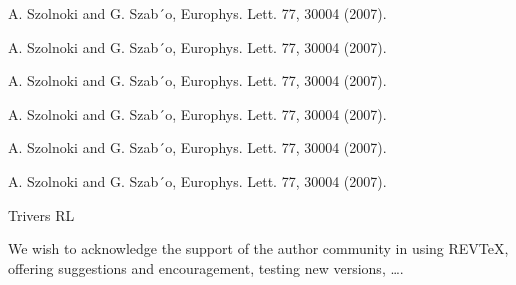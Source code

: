 \documentclass[%
 aip,
 amsmath,amssymb,
 reprint,%
]{revtex4-1}
\begin{document}
\begin{thebibliography}{99}
A. Szolnoki and G. Szab´o,
\newblock  Europhys. Lett. 77, 30004 (2007).

A. Szolnoki and G. Szab´o,
\newblock  Europhys. Lett. 77, 30004 (2007).

A. Szolnoki and G. Szab´o,
\newblock  Europhys. Lett. 77, 30004 (2007).

A. Szolnoki and G. Szab´o,
\newblock  Europhys. Lett. 77, 30004 (2007).

A. Szolnoki and G. Szab´o,
\newblock  Europhys. Lett. 77, 30004 (2007).

A. Szolnoki and G. Szab´o,
\newblock  Europhys. Lett. 77, 30004 (2007).


\end{thebibliography}Trivers RL



\begin{acknowledgments}
We wish to acknowledge the support of the author community in using
REV\TeX{}, offering suggestions and encouragement, testing new versions,
\dots.
\end{acknowledgments}



\nocite{*}
\end{document}
